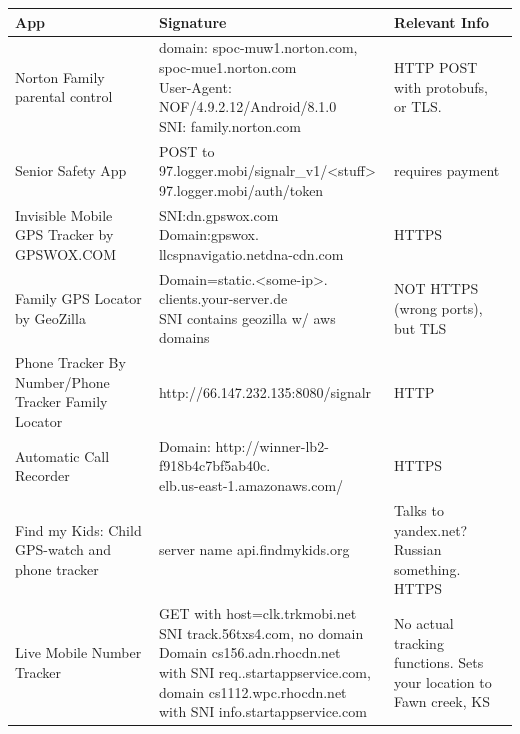 \documentclass[acmtog]{acmart}
\begin{document}
\begin{table}
\begin{tabular}{p{5cm}p{5cm}p{5cm}}
	\toprule
	App & Signature & Relevant Info \\
	\midrule
	Norton Family parental control & \makecell{domain: spoc-muw1.norton.com,\\spoc-mue1.norton.com\\
	User-Agent: NOF/4.9.2.12/Android/8.1.0\\
	SNI: family.norton.com} & HTTP POST with protobufs, or TLS. \\
	
	Senior Safety App & \makecell{POST to \\97.logger.mobi/signalr\_v1/<stuff>\\
	97.logger.mobi/auth/token} & requires payment\\
	
	Invisible Mobile GPS Tracker by
	GPSWOX.COM & \makecell{SNI:dn.gpswox.com\\ Domain:gpswox.\\llcspnavigatio.netdna-cdn.com} & HTTPS \\
	
	Family GPS Locator by GeoZilla & \makecell{Domain=static.<some-ip>.\\clients.your-server.de\\
	SNI contains geozilla w/ aws domains} & NOT HTTPS (wrong ports), but TLS \\
	
	Phone Tracker By Number/Phone Tracker Family Locator & http://66.147.232.135:8080/signalr & HTTP \\
	
	Automatic Call Recorder & \makecell{Domain: http://winner-lb2-\\f918b4c7bf5ab40c.\\elb.us-east-1.amazonaws.com/ }& HTTPS \\
	
	Find my Kids: Child GPS-watch and phone tracker & server name api.findmykids.org & Talks to yandex.net? Russian something. 
	HTTPS \\
	
	Live Mobile Number Tracker & \makecell{GET with host=clk.trkmobi.net\\
	SNI track.56txs4.com, no domain\\
	Domain cs156.adn.rhocdn.net\\ with SNI req..startappservice.com,\\
	domain cs1112.wpc.rhocdn.net\\ with SNI info.startappservice.com} & No actual tracking functions. Sets your location to Fawn creek, KS \\
	

\end{tabular}
\end{table}
\end{document}
